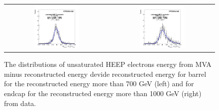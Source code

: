 \begin{figure}[bh]
  \begin{center}
    \begin{tabular}{cc}
      \includegraphics[width=0.45\textwidth]{chapters/Zprime/Saturation/images/ZToEE/data_B700_E1000/fit_BDTG_Barrel_Endcap_B_reg_nos.png} &
      \includegraphics[width=0.45\textwidth]{chapters/Zprime/Saturation/images/ZToEE/data_B700_E1000/fit_BDTG_Barrel_Endcap_E_reg_nos.png} \\
    \end{tabular}
    \caption{ The distributions of unsaturated HEEP electrons energy from MVA minus reconstructed energy devide reconstructed energy for barrel for the reconstructed energy more than 700 GeV (left) and for endcap for the reconstructed energy more than 1000 GeV (right) from data.}
    \label{fig:data_2}
  \end{center}
\end{figure}

